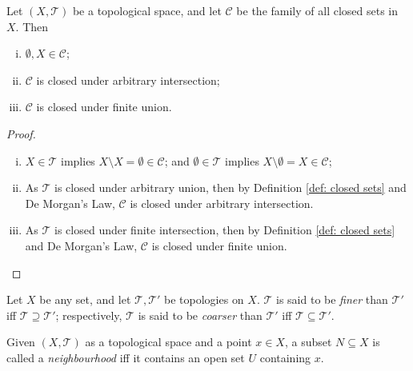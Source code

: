\begin{corollary}
	\label{prop: dark side of topology}
	Let $(X, \mathcal T)$ be a topological space, and let $\mathcal C$ be the family of all closed sets in $X$. Then
	\begin{enumerate}[(i)]
		\item
		$\emptyset, X \in \mathcal C$;
		
		\item
		$\mathcal C$ is closed under arbitrary intersection;
		
		\item
		$\mathcal C$ is closed under finite union.
	\end{enumerate}
	
	\begin{proof}
		\
		\begin{enumerate}[(i)]
			\item
			$X \in \mathcal T$ implies $X \setminus X = \emptyset \in \mathcal C$; and $\emptyset \in \mathcal T$ implies $X \setminus \emptyset = X \in \mathcal C$;
			
			\item
			As $\mathcal T$ is closed under arbitrary union, then by Definition \ref{def: closed sets} and De Morgan's Law, $\mathcal C$ is closed under arbitrary intersection.
			
			\item
			As $\mathcal T$ is closed under finite intersection, then by Definition \ref{def: closed sets} and De Morgan's Law, $\mathcal C$ is closed under finite union.
		\end{enumerate}
	\end{proof}
\end{corollary}


\begin{definition}
	\label{def: finer and coarser topology} Let $X$ be any set, and let $\mathcal T, \mathcal T'$ be topologies on $X$. $\mathcal T$ is said to be \textit{finer} than $\mathcal T'$ iff $\mathcal T \supseteq \mathcal T'$; respectively, $\mathcal T$ is said to be \textit{coarser} than $\mathcal T'$ iff $\mathcal T \subseteq \mathcal T'$.
\end{definition}


\begin{definition}
	[neighbourhood]
	\label{def: neighbourhood}
	Given $(X, \mathcal T)$ as a topological space and a point $x \in X$, a subset $N \subseteq X$ is called a \textit{neighbourhood} iff it contains an open set $U$ containing $x$.
\end{definition}



